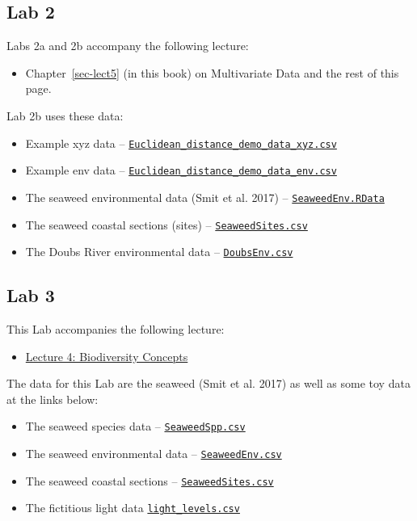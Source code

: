 \documentclass[
  11pt,
]{book}
\providecommand{\tightlist}{%
  \setlength{\itemsep}{0pt}\setlength{\parskip}{0pt}}
\let\oldtexttt\texttt
\renewcommand{\texttt}[1]{\oldtexttt{\small #1}}
\begin{document}
\subsection{Lab 2}\label{lab-2}

Labs 2a and 2b accompany the following lecture:

\begin{itemize}
\tightlist
\item
  Chapter~\ref{sec-lect5} (in this book) on Multivariate Data and the
  rest of this page.
\end{itemize}

Lab 2b uses these data:

\begin{itemize}
\tightlist
\item
  Example xyz data --
  \href{../data/Euclidean_distance_demo_data_xyz.csv}{\texttt{Euclidean\_distance\_demo\_data\_xyz.csv}}
\item
  Example env data --
  \href{../data/Euclidean_distance_demo_data_env.csv}{\texttt{Euclidean\_distance\_demo\_data\_env.csv}}
\item
  The seaweed environmental data (Smit et al. 2017) --
  \href{../data/seaweed/SeaweedEnv.RData}{\texttt{SeaweedEnv.RData}}
\item
  The seaweed coastal sections (sites) --
  \href{../data/seaweed/SeaweedSites.csv}{\texttt{SeaweedSites.csv}}
\item
  The Doubs River environmental data --
  \href{../data/DoubsEnv.csv}{\texttt{DoubsEnv.csv}}
\end{itemize}

\subsection{Lab 3}\label{lab-3}

This Lab accompanies the following lecture:

\begin{itemize}
\tightlist
\item
  \href{Lec-04-biodiversity.html}{Lecture 4: Biodiversity Concepts}
\end{itemize}

The data for this Lab are the seaweed (Smit et al. 2017) as well as some
toy data at the links below:

\begin{itemize}
\tightlist
\item
  The seaweed species data --
  \href{../data/seaweed/SeaweedSpp.csv}{\texttt{SeaweedSpp.csv}}
\item
  The seaweed environmental data --
  \href{../data/seaweed/SeaweedEnv.csv}{\texttt{SeaweedEnv.csv}}
\item
  The seaweed coastal sections --
  \href{../data/seaweed/SeaweedSites.csv}{\texttt{SeaweedSites.csv}}
\item
  The fictitious light data
  \href{../data/light_levels.csv}{\texttt{light\_levels.csv}}
\end{itemize}
\end{document}
